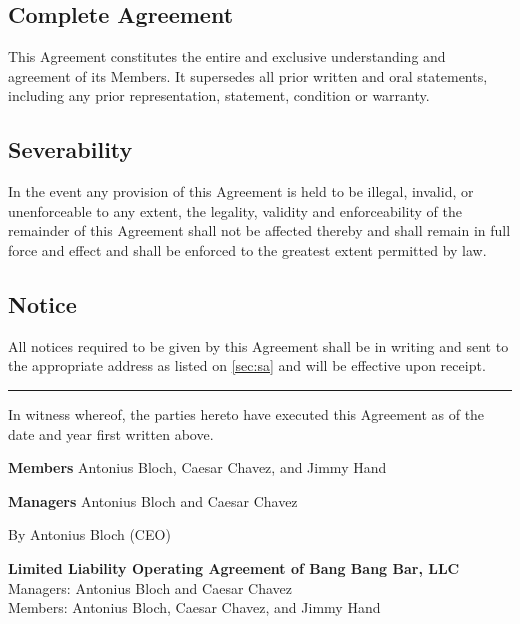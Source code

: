 \documentclass[11pt,onecolumn]{article}
\newcommand{\members}{Antonius Bloch, Caesar Chavez, and Jimmy Hand}
\newcommand{\managers}{Antonius Bloch and Caesar Chavez}
\newcommand{\ceo}{Antonius Bloch}
\begin{document}
\subsection{Complete Agreement}

This Agreement constitutes the entire and exclusive understanding and agreement of its Members. It supersedes all prior written and oral statements, including any prior representation, statement, condition or warranty.

\subsection{Severability}

In the event any provision of this Agreement is held to be illegal, invalid, or unenforceable to any extent, the legality, validity and enforceability of the remainder of this Agreement shall not be affected thereby and shall remain in full force and effect and shall be enforced to the greatest extent permitted by law.

\subsection{Notice}

All notices required to be given by this Agreement shall be in writing and sent to the appropriate address as listed on \autoref{sec:sa} and will be effective upon receipt.

\vspace{1\baselineskip}
\hrule

In witness whereof, the parties hereto have executed this Agreement as of the date and year first written above.

{\sffamily\bfseries Members}
\members{}

{\sffamily\bfseries Managers}
\managers{}

By \ceo{} (CEO)

\newpage
\schedule{} \label{sec:sa}

\begin{center}
	{\sffamily\bfseries\large
		Limited Liability Operating Agreement of Bang Bang Bar, LLC
	} \\
	\vspace{3pt}
	\vspace{3pt}
	{
		\hspace*{\fill}
		Managers: \managers{}
		\hspace*{\fill}
	} \\
	{
		\hspace*{\fill}
		Members: \members{}
		\hspace*{\fill}
	}
\end{center}
\end{document}
